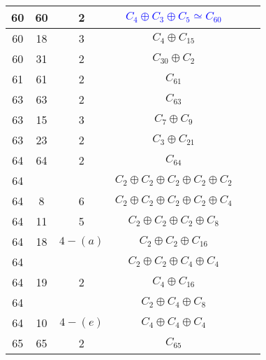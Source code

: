 \documentclass[12pt, openany]{report}
\begin{document}
\begin{tabular}{|c||c|c|c|c|c|}
\hline 60& 60 & 2 &  \textcolor{blue}{$ C_{4}\oplus C_{3}\oplus C_{5} \simeq C_{60}$} \\ 
\hline 60&18&3&$C_{4}\oplus C_{15}$\\%
\hline 60&31&2&$C_{30}\oplus C_{2}$\\
\hline 61& 61& 2 &$C_{61}$\\
\hline 63& 63& 2 &$C_{63}$ \\ 
\hline 63& 15&3 &$C_{7}\oplus C_{9}$ \\ %
\hline 63& 23 & 2 &$C_{3}\oplus C_{21}$ \\
\hline 64& 64 & 2 &$C_{64}$ \\
\hline 64& &  &$C_{2}\oplus C_{2}\oplus C_{2}\oplus C_{2}\oplus C_{2}$\\
\hline 64& 8& 6 &$C_{2}\oplus C_{2}\oplus C_{2}\oplus C_{2}\oplus C_{4} $\\
\hline 64& 11 &5 &$C_{2}\oplus C_{2}\oplus C_{2}\oplus C_{8}$\\
\hline 64& 18 &$4-(a)$ &$C_{2}\oplus C_{2}\oplus C_{16}$\\
\hline 64& &  &$ C_{2}\oplus C_{2}\oplus C_{4}\oplus C_{4}$\\
\hline 64&19& 2 &$C_{4}\oplus C_{16}$\\
\hline 64& &  &$C_{2} \oplus C_{4}\oplus C_{8}$\\
\hline 64& 10 & $4-(e)$ &$C_{4}\oplus C_{4}\oplus C_{4}$ \\
\hline 65& 65& 2 &$ C_{65}$\\
\hline 
\end{tabular}
\end{document}

